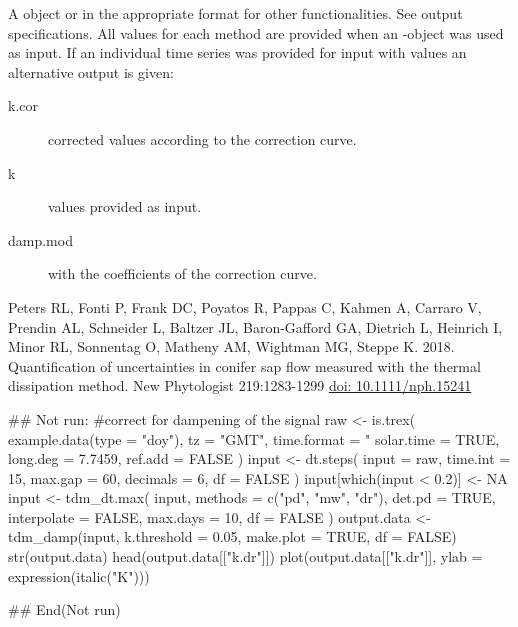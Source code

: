 \documentclass[a4paper]{book}
\begin{document}
\begin{Value}
A  object or  in the appropriate
format for other functionalities.
See  output specifications.
All  values for each method are provided when an -object was used as input.
If an individual time series was provided for input with  values an alternative output is given:

\begin{description}

\item[k.cor] corrected  values according to the correction curve.
\item[k]  values provided as input.
\item[damp.mod]  with the coefficients of the correction curve.


\end{description}

\end{Value}
%
\begin{References}\relax
Peters RL, Fonti P, Frank DC, Poyatos R, Pappas C, Kahmen A, Carraro V,
Prendin AL, Schneider L, Baltzer JL, Baron-Gafford GA, Dietrich L, Heinrich I,
Minor RL, Sonnentag O, Matheny AM, Wightman MG, Steppe K. 2018.
Quantification of uncertainties in conifer sap flow measured with the thermal
dissipation method. New Phytologist 219:1283-1299 \url{doi: 10.1111/nph.15241}
\end{References}
%
\begin{Examples}
\begin{ExampleCode}
## Not run: 
 #correct for dampening of the signal
raw   <-
  is.trex(
    example.data(type = "doy"),
    tz = "GMT",
    time.format = "%
    solar.time = TRUE,
    long.deg = 7.7459,
    ref.add = FALSE
  )
input <-
  dt.steps(
    input = raw,
    time.int = 15,
    max.gap = 60,
    decimals = 6,
    df = FALSE
  )
input[which(input < 0.2)] <- NA
input <-
  tdm_dt.max(
    input,
    methods = c("pd", "mw", "dr"),
    det.pd = TRUE,
    interpolate = FALSE,
    max.days = 10,
    df = FALSE
  )
output.data <- tdm_damp(input,
                    k.threshold = 0.05,
                    make.plot = TRUE,
                    df = FALSE)
str(output.data)
head(output.data[["k.dr"]])
plot(output.data[["k.dr"]], ylab = expression(italic("K")))

## End(Not run)

\end{ExampleCode}
\end{Examples}
\end{document}
